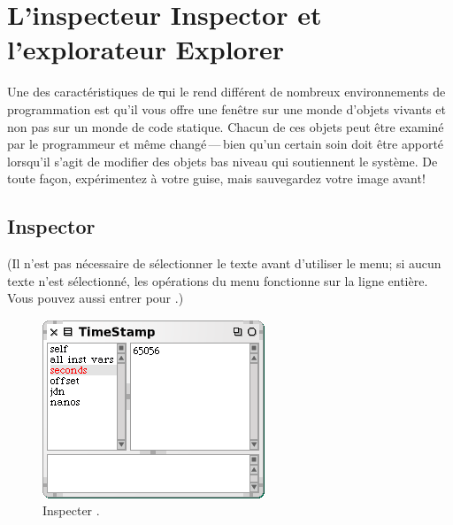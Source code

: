 \documentclass[a4paper,10pt,twoside]{book}
\begin{document}
\section{L'inspecteur Inspector et l'explorateur Explorer}
\label{sec:inspector} %

Une des caract\'eristiques de \st qui le rend diff\'erent de nombreux 
environnements de programmation est qu'il vous offre une fen\^etre 
sur une monde d'objets vivants et non pas sur un monde de code statique.
Chacun de ces objets peut \^etre examin\'e par le programmeur et m\^eme
chang\'e\,---\,bien qu'un certain soin doit \^etre apport\'e lorsqu'il s'agit
de modifier des objets bas niveau qui soutiennent le syst\`eme.
De toute fa\c{c}on, exp\'erimentez \`a votre guise, mais sauvegardez votre
image avant!

\subsection{Inspector}

(Il n'est pas n\'ecessaire de s\'electionner le texte avant d'utiliser le menu;
si aucun texte n'est s\'electionn\'e, les op\'erations du menu fonctionne
sur la ligne enti\`ere.
Vous pouvez aussi entrer  pour .)

\begin{figure}[btp]
	\begin{center}
		\includegraphics[scale=0.7]{inspectTimeNow1}
	\end{center}
	\caption{Inspecter .}
	\label{fig:inspectTimeNow1}
\end{figure}
\end{document}

